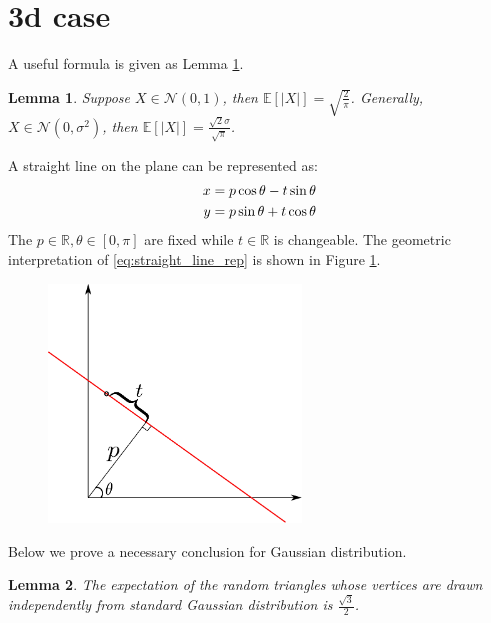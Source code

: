 \documentclass{article}
\newtheorem{lemma}{Lemma}
\def\E{\mathbb{E}}
\def\R{\mathbb{R}}
\begin{document}
\section{3d case}
A useful formula is given as Lemma \ref{lem:abs_gaussian}.
\begin{lemma}\label{lem:abs_gaussian}
Suppose $X \in \mathcal{N}(0,1)$,
then $\E[|X|]=\sqrt{\frac{2}{\pi}}$.
Generally, $X \in \mathcal{N}(0,\sigma^2)$,
then $\E[|X|]=\frac{\sqrt{2}\sigma}{\sqrt{\pi}}$.
\end{lemma}
A straight line on the plane
can be represented as:
\begin{align}
    x & = p \cos \theta - t \sin \theta \notag \\
    y & = p \sin \theta + t \cos \theta \label{eq:straight_line_rep}
\end{align}
The $p \in \R, \theta \in [0, \pi]$ are fixed while
$t \in \R$ is changeable.
The geometric interpretation of \eqref{eq:straight_line_rep}
is shown in Figure \ref{fig:transformation}.
\begin{figure}[!ht]
    \centering
    \includegraphics[width=0.6\textwidth]{transformation.pdf}
    \caption{}\label{fig:transformation}
\end{figure}
Below we prove a necessary conclusion for Gaussian distribution.
\begin{lemma}
    The expectation of the random triangles whose
    vertices are drawn independently
    from standard Gaussian distribution is $\frac{\sqrt{3}}{2}$.
\end{lemma}
\end{document}
